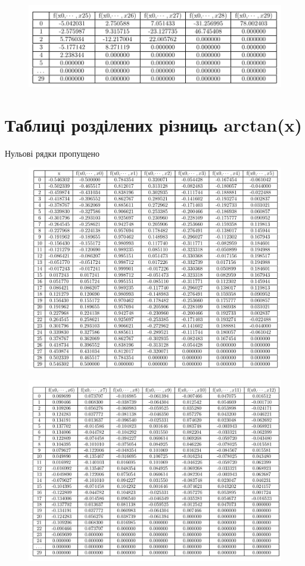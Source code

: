 \documentclass[a4paper, 12pt]{article}
\begin{document}
\begin{figure}[ht]
	\centering
	\includegraphics[width=1\linewidth]{./img/t15.png}
\end{figure}

\clearpage
\newpage
\section{Таблиці розділених різниць arctan(x)} \label{sec:table2}
Нульові рядки пропущено

\begin{figure}[ht]
	\centering
	\includegraphics[width=1\linewidth]{./img/t21.png}
\end{figure}

\begin{figure}[ht]
	\centering
	\includegraphics[width=1\linewidth]{./img/t22.png}
\end{figure}
\end{document}
